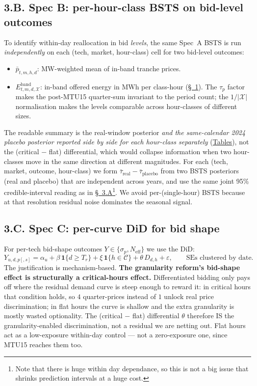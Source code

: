 \documentclass[11pt]{article}
\begin{document}
\subsection*{3.B. Spec B: per-hour-class BSTS on bid-level outcomes}\label{sec:smart_desc}
To identify within-day reallocation in bid \emph{levels}, the same Spec~A BSTS is run \emph{independently} on each (tech, market, hour-class) cell for two bid-level outcomes:
\begin{itemize}\setlength{\itemsep}{1pt}
  \item $\bar p_{t,m,h,d}$: MW-weighted mean of in-band tranche prices.
  \item $E^{\text{band}}_{t,m,d,\mathcal{X}}$: in-band offered energy in MWh per class-hour (\hyperref[sec:setup]{\S~1}). The $\tau_p$ factor makes the post-MTU15 quarter-sum invariant to the period count; the $1/|\mathcal{X}|$ normalisation makes the levels comparable across hour-classes of different sizes.
\end{itemize}
The readable summary is the real-window posterior \emph{and the same-calendar 2024 placebo posterior reported side by side for each hour-class separately} (\hyperref[tab:specB-id15]{Tables}), not the (critical $-$ flat) differential, which would collapse information when two hour-classes move in the same direction at different magnitudes. For each (tech, market, outcome, hour-class) we form $\bar\tau_{\text{real}} - \bar\tau_{\text{placebo}}$ from two BSTS posteriors (real and placebo) that are independent across years, and use the same joint 95\% credible-interval reading as in \hyperref[sec:bsts]{\S~3.A}\footnote{Note that there is huge within day dependance, so this is not a big issue that shrinks prediction intervals at a huge cost.}. We avoid per-(single-hour) BSTS because at that resolution residual noise dominates the seasonal signal.

\subsection*{3.C. Spec C: per-curve DiD for bid shape}\label{sec:did}
For per-tech bid-shape outcomes $Y\in\{\sigma_p, N_{\text{eff}}\}$ we use the DiD:
\[
Y_{u,d,p[,s]} = \alpha_u + \beta\,\mathbf{1}\{d\ge T_r\} + \xi\,\mathbf{1}\{h\in\mathcal{C}\} + \theta\,D_{d,h} + \varepsilon, \qquad \text{SEs clustered by date.}
\]
The justification is mechanism-based. \textbf{The granularity reform's bid-shape effect is structurally a critical-hours effect.} Differentiated bidding only pays off where the residual demand curve is steep enough to reward it: in critical hours that condition holds, so $4$ quarter-prices instead of $1$ unlock real price discrimination; in flat hours the curve is shallow and the extra granularity is mostly wasted optionality. The (critical $-$ flat) differential $\theta$ therefore IS the granularity-enabled discrimination, not a residual we are netting out. Flat hours act as a low-exposure within-day control --- not a zero-exposure one, since MTU15 reaches them too.
\end{document}
